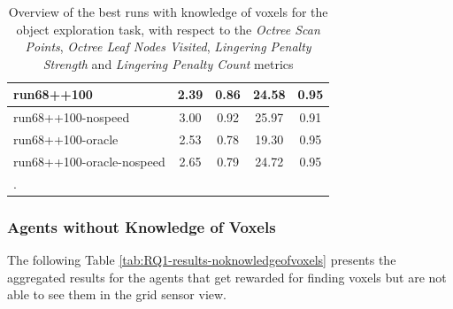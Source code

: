 \begin{longtable}{|l|c|c|c|c|}
run68++100 & {\cellcolor[HTML]{D7E9E5}} \color[HTML]{000000} 2.39 & {\cellcolor[HTML]{EBF2F0}} \color[HTML]{000000} 0.86 & 24.58 & 0.95 \\ \hline
run68++100-nospeed & {\cellcolor[HTML]{CEE4E0}} \color[HTML]{000000} 3.00 & {\cellcolor[HTML]{EBF2F0}} \color[HTML]{000000} 0.92 & 25.97 & 0.91 \\ \hline
run68++100-oracle & {\cellcolor[HTML]{D5E8E4}} \color[HTML]{000000} 2.53 & {\cellcolor[HTML]{EBF2F0}} \color[HTML]{000000} 0.78 & 19.30 & 0.95 \\ \hline
run68++100-oracle-nospeed & {\cellcolor[HTML]{D4E7E3}} \color[HTML]{000000} 2.65 & {\cellcolor[HTML]{EBF2F0}} \color[HTML]{000000} 0.79 & 24.72 & 0.95 \\ \hline

    \caption{Overview of the best runs with knowledge of voxels for the object exploration task, with respect to the \textit{Octree Scan Points}, \textit{Octree Leaf Nodes Visited}, \textit{Lingering Penalty Strength} and \textit{Lingering Penalty Count} metrics}. \label{tab:results-RQ1-explorative-performance}
\end{longtable}


\newpage
\subsubsection{Agents without Knowledge of Voxels}
The following Table \ref{tab:RQ1-results-noknowledgeofvoxels} presents the aggregated results for the agents that get rewarded for finding voxels but are not able to see them in the grid sensor view.

